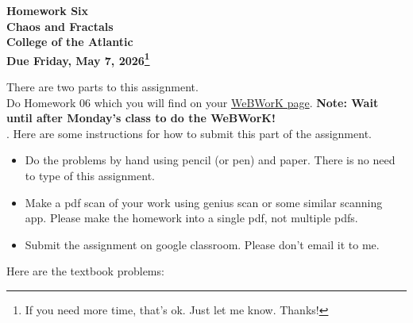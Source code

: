 \documentclass[12pt]{extarticle}
\begin{document}
\pagestyle{empty}
 
\begin{center}
{\LARGE {\bf Homework Six}}\\
\bigskip
{\Large {\bf Chaos and Fractals}}\\
\bigskip
{\Large {\bf College of the Atlantic}}\\
\bigskip
{ {\bf Due Friday, May 7, 2026\footnote{If you need more time,
      that's ok. Just let me know. Thanks!}}}\\  
\end{center}
\medskip


\noindent There are two parts to this assignment.\\

 Do Homework 06 which you
will find on your  
\href{https://webwork-hosting.runestone.academy/webwork2/coa-feldman-es1026i-spring2026}{WeBWorK 
  page}. \textbf{Note: Wait until after Monday's class to do the WeBWorK!}\\ 


.  Here are some
instructions for how to submit this part of the assignment.
\begin{itemize}
\item Do the problems by hand using pencil (or pen) and paper.
  There is no need to type of this assignment.
\item Make a pdf scan of your work using genius scan or some
  similar scanning app. Please make the homework into a single
  pdf, not multiple pdfs.
\item Submit the assignment on google classroom.  Please don't
  email it to me. 
\end{itemize}

\noindent Here are the textbook problems:
\end{document}
